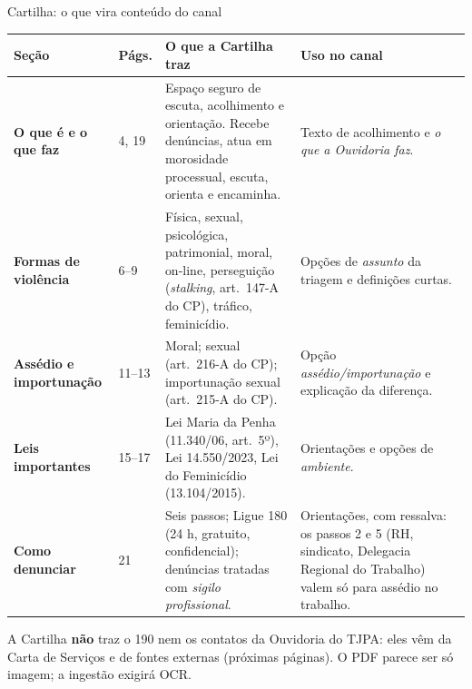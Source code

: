 \documentclass[aspectratio=169,10pt]{beamer}
\begin{document}
\begin{frame}{Cartilha: o que vira conteúdo do canal}
\scriptsize
\begin{tabularx}{\linewidth}{@{}>{\bfseries}p{2.9cm}p{1.2cm}>{\raggedright\arraybackslash}X>{\raggedright\arraybackslash}X@{}}
\toprule
Seção & Págs. & O que a Cartilha traz & Uso no canal \\
\midrule
O que é e o que faz & 4, 19 & Espaço seguro de escuta, acolhimento e orientação. Recebe denúncias, atua em morosidade processual, escuta, orienta e encaminha. & Texto de acolhimento e \emph{o que a Ouvidoria faz}. \\
Formas de violência & 6--9 & Física, sexual, psicológica, patrimonial, moral, on-line, perseguição (\emph{stalking}, art.~147-A do CP), tráfico, feminicídio. & Opções de \emph{assunto} da triagem e definições curtas. \\
Assédio e importunação & 11--13 & Moral; sexual (art.~216-A do CP); importunação sexual (art.~215-A do CP). & Opção \emph{assédio/importunação} e explicação da diferença. \\
Leis importantes & 15--17 & Lei Maria da Penha (11.340/06, art.~5º), Lei 14.550/2023, Lei do Feminicídio (13.104/2015). & Orientações e opções de \emph{ambiente}. \\
Como denunciar & 21 & Seis passos; Ligue 180 (24 h, gratuito, confidencial); denúncias tratadas com \emph{sigilo profissional}. & Orientações, \alert{com ressalva}: os passos 2 e 5 (RH, sindicato, Delegacia Regional do Trabalho) valem só para assédio no trabalho. \\
\bottomrule
\end{tabularx}
\vskip4pt
{\scriptsize\textcolor{cinza}{A Cartilha \textbf{não} traz o 190 nem os contatos da Ouvidoria do TJPA: eles vêm da Carta de Serviços e de fontes externas (próximas páginas). O PDF parece ser só imagem; a ingestão exigirá OCR.}}
\end{frame}
\end{document}
